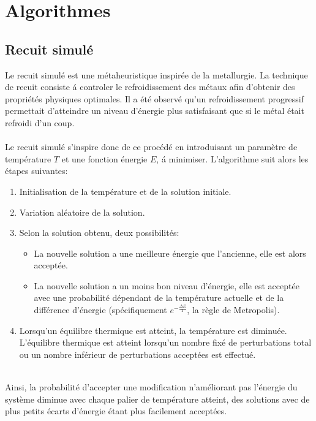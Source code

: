 \documentclass{report}
\begin{document}
\chapter{Algorithmes}

\section{Recuit simulé}

Le recuit simul\'e est une m\'etaheuristique inspir\'ee de la metallurgie.
La technique de recuit consiste \'a controler le refroidissement des m\'etaux
afin d'obtenir des propri\'et\'es physiques optimales. Il a \'et\'e observ\'e qu'un
refroidissement progressif permettait d'atteindre un niveau d'\'energie plus
satisfaisant que si le m\'etal \'etait refroidi d'un coup.\\\\

Le recuit simul\'e s'inspire donc de ce proc\'ed\'e en introduisant un param\`etre
de temp\'erature $T$ et une fonction \'energie $E$, \'a minimiser. L'algorithme
suit alors les \'etapes suivantes:
\begin{enumerate}
\item Initialisation de la temp\'erature et de la solution initiale.
\item Variation al\'eatoire de la solution.
\item Selon la solution obtenu, deux possibilit\'es:
	\begin{itemize}
		\item La nouvelle solution a une meilleure \'energie que l'ancienne,
			elle est alors accept\'ee.
		\item La nouvelle solution a un moins bon niveau d'\'energie, elle
			est accept\'ee avec une probabilit\'e d\'ependant de la temp\'erature
			actuelle et de la diff\'erence d'\'energie (sp\'ecifiquement
			$e^{-\frac{\Delta E}{T}} $, la r\`egle de Metropolis).
	\end{itemize}
\item Lorsqu'un \'equilibre thermique est atteint, la temp\'erature est
		 diminu\'ee. L'\'equilibre thermique est atteint lorsqu'un nombre fix\'e
		 de perturbations total  ou un nombre inf\'erieur de perturbations
		 accept\'ees est effectu\'e.\\\\
\end{enumerate}

Ainsi, la probabilit\'e d'accepter une modification n'am\'eliorant pas l'\'energie
du syst\`eme diminue avec chaque palier de temp\'erature atteint, des solutions
avec de plus petits \'ecarts d'\'energie \'etant plus facilement accept\'ees.\\\\
\end{document}
